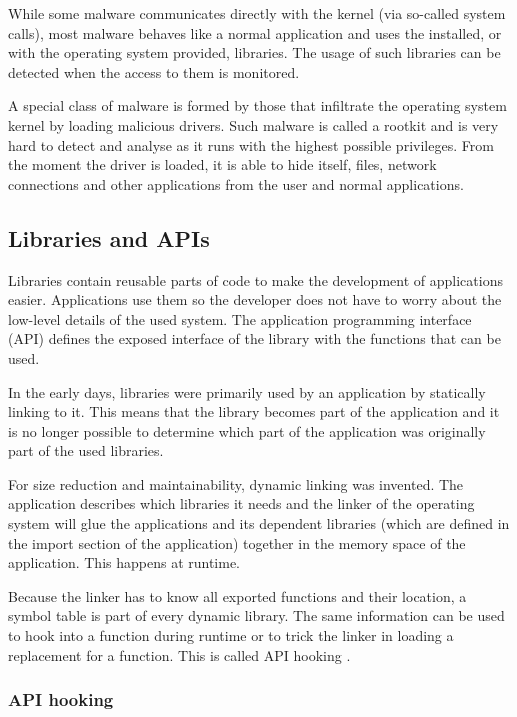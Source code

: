 While some malware communicates directly with the kernel (via so-called system calls), most malware \cite{MaliciousAPIs} behaves like a normal application and uses the installed, or with the operating system provided, libraries. The usage of such libraries can be detected when the access to them is monitored.

A special class of malware \cite{ZeroAccess,Gameover} is formed by those that infiltrate the operating system kernel by loading malicious drivers. Such malware is called a rootkit and is very hard to detect and analyse as it runs with the highest possible privileges. From the moment the driver is loaded, it is able to hide itself, files, network connections and other applications from the user and normal applications.

\subsection{Libraries and APIs}

Libraries contain reusable parts of code to make the development of applications easier. Applications use them so the developer does not have to worry about the low-level details of the used system. The application programming interface (API) defines the exposed interface of the library with the functions that can be used.

In the early days, libraries were primarily used by an application by statically linking to it. This means that the library becomes part of the application and it is no longer possible to determine which part of the application was originally part of the used libraries.

For size reduction and maintainability, dynamic linking was invented. The application describes which libraries it needs and the linker of the operating system will glue the applications and its dependent libraries (which are defined in the import section of the application) together in the memory space of the application. This happens at runtime. 

Because the linker has to know all exported functions and their location, a symbol table is part of every dynamic library. The same information can be used to hook into a function during runtime or to trick the linker in loading a replacement for a function. This is called API hooking \cite{APIHookingRevealed}.

\subsubsection{API hooking}


